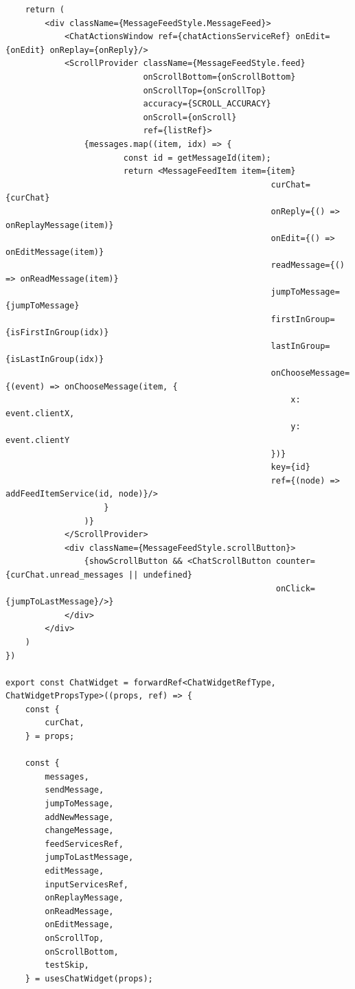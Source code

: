 \begin{lstlisting}
    return (
        <div className={MessageFeedStyle.MessageFeed}>
            <ChatActionsWindow ref={chatActionsServiceRef} onEdit={onEdit} onReplay={onReply}/>
            <ScrollProvider className={MessageFeedStyle.feed}
                            onScrollBottom={onScrollBottom}
                            onScrollTop={onScrollTop}
                            accuracy={SCROLL_ACCURACY}
                            onScroll={onScroll}
                            ref={listRef}>
                {messages.map((item, idx) => {
                        const id = getMessageId(item);
                        return <MessageFeedItem item={item}
                                                      curChat={curChat}
                                                      onReply={() => onReplayMessage(item)}
                                                      onEdit={() => onEditMessage(item)}
                                                      readMessage={() => onReadMessage(item)}
                                                      jumpToMessage={jumpToMessage}
                                                      firstInGroup={isFirstInGroup(idx)}
                                                      lastInGroup={isLastInGroup(idx)}
                                                      onChooseMessage={(event) => onChooseMessage(item, {
                                                          x: event.clientX,
                                                          y: event.clientY
                                                      })}
                                                      key={id}
                                                      ref={(node) => addFeedItemService(id, node)}/>
                    }
                )}
            </ScrollProvider>
            <div className={MessageFeedStyle.scrollButton}>
                {showScrollButton && <ChatScrollButton counter={curChat.unread_messages || undefined}
                                                       onClick={jumpToLastMessage}/>}
            </div>
        </div>
    )
})

export const ChatWidget = forwardRef<ChatWidgetRefType, ChatWidgetPropsType>((props, ref) => {
    const {
        curChat,
    } = props;

    const {
        messages,
        sendMessage,
        jumpToMessage,
        addNewMessage,
        changeMessage,
        feedServicesRef,
        jumpToLastMessage,
        editMessage,
        inputServicesRef,
        onReplayMessage,
        onReadMessage,
        onEditMessage,
        onScrollTop,
        onScrollBottom,
        testSkip,
    } = usesChatWidget(props);


\end{lstlisting}
